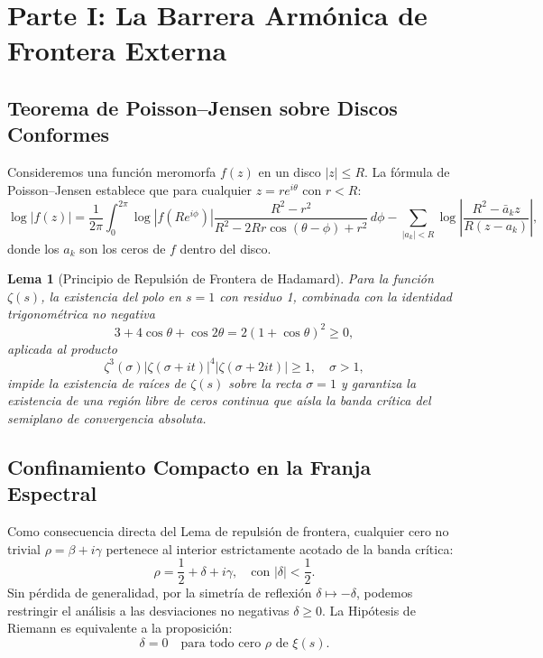 \documentclass[11pt,a4paper]{article}
\newtheorem{lemma}[theorem]{Lema}
\theoremstyle{definition}
\theoremstyle{remark}
\begin{document}
\section{Parte I: La Barrera Armónica de Frontera Externa}

\subsection{Teorema de Poisson--Jensen sobre Discos Conformes}

Consideremos una función meromorfa $f(z)$ en un disco $|z| \le R$. La fórmula de Poisson--Jensen establece que para cualquier $z = r e^{i\theta}$ con $r < R$:
\begin{equation}
\log |f(z)| = \frac{1}{2\pi} \int_0^{2\pi} \log |f(R e^{i\phi})| \frac{R^2 - r^2}{R^2 - 2Rr\cos(\theta - \phi) + r^2} \, d\phi - \sum_{|a_k| < R} \log \left| \frac{R^2 - \bar{a}_k z}{R(z - a_k)} \right|,
\end{equation}
donde los $a_k$ son los ceros de $f$ dentro del disco.

\begin{lemma}[Principio de Repulsión de Frontera de Hadamard]
Para la función $\zeta(s)$, la existencia del polo en $s = 1$ con residuo 1, combinada con la identidad trigonométrica no negativa
\begin{equation}
3 + 4\cos \theta + \cos 2\theta = 2(1 + \cos\theta)^2 \ge 0,
\end{equation}
aplicada al producto
\begin{equation}
\zeta^3(\sigma) |\zeta(\sigma + it)|^4 |\zeta(\sigma + 2it)| \ge 1, \quad \sigma > 1,
\end{equation}
impide la existencia de raíces de $\zeta(s)$ sobre la recta $\sigma = 1$ y garantiza la existencia de una región libre de ceros continua que aísla la banda crítica del semiplano de convergencia absoluta.
\end{lemma}

\subsection{Confinamiento Compacto en la Franja Espectral}

Como consecuencia directa del Lema de repulsión de frontera, cualquier cero no trivial $\rho = \beta + i\gamma$ pertenece al interior estrictamente acotado de la banda crítica:
\begin{equation}
\rho = \frac{1}{2} + \delta + i\gamma, \quad \text{con } |\delta| < \frac{1}{2}.
\end{equation}
Sin pérdida de generalidad, por la simetría de reflexión $\delta \mapsto -\delta$, podemos restringir el análisis a las desviaciones no negativas $\delta \ge 0$. La Hipótesis de Riemann es equivalente a la proposición:
\begin{equation}
\delta = 0 \quad \text{para todo cero } \rho \text{ de } \xi(s).
\end{equation}
\end{document}
